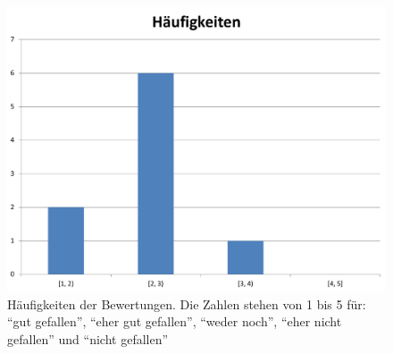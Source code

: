 \begin{figure}[h!tbp]
    \begin{center}
        \includegraphics[width=\textwidth]{images/haeufigkeiten}
    \end{center}
    \caption{Häufigkeiten der Bewertungen. Die Zahlen 
    stehen von 1 bis 5 für: \enquote{gut gefallen}, \enquote{eher gut 
    gefallen}, \enquote{weder noch}, \enquote{eher nicht gefallen} und 
    \enquote{nicht gefallen}}
    \label{fig:haeufigkeiten}
\end{figure}


